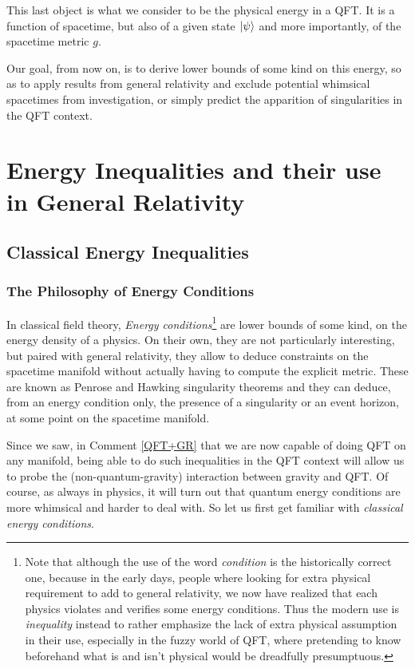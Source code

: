 \documentclass[a4paper,11pt]{article}
\numberwithin{equation}{section}
\theoremstyle{definition}
\begin{document}
    This last object is what we consider to be the physical energy in a QFT. It is a function of spacetime, but also of a given state $\ket{\psi}$ and more importantly, of the spacetime metric $g$.

    Our goal, from now on, is to derive lower bounds of some kind on this energy, so as to apply results from general relativity and exclude potential whimsical spacetimes from investigation, or simply predict the apparition of singularities in the QFT context.
    
\section{Energy Inequalities and their use in General Relativity}
\subsection{Classical Energy Inequalities}
\subsubsection{The Philosophy of Energy Conditions}
In classical field theory, \emph{Energy conditions}\footnote{Note that although the use of the word \textit{condition} is the historically correct one, because in the early days, people where looking for extra physical requirement to add to general relativity, we now have realized that each physics violates and verifies some energy conditions. Thus the modern use is \textit{inequality} instead to rather emphasize the lack of extra physical assumption in their use, especially in the fuzzy world of QFT, where pretending to know beforehand what is and isn't physical would be dreadfully presumptuous.} are lower bounds of some kind, on the energy density of a physics. On their own, they are not particularly interesting, but paired with general relativity, they allow to deduce constraints on the spacetime manifold without actually having to compute the explicit metric. These are known as Penrose and Hawking singularity theorems \cite{SingTheo} and they can deduce, from an energy condition only, the presence of a singularity or an event horizon, at some point on the spacetime manifold. 

Since we saw, in Comment \ref{QFT+GR} that we are now capable of doing QFT on any manifold, being able to do such inequalities in the QFT context will allow us to probe the (non-quantum-gravity) interaction between gravity and QFT. Of course, as always in physics, it will turn out that quantum energy conditions are more whimsical and harder to deal with. So let us first get familiar with \emph{classical energy conditions}.
\end{document}
